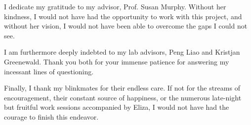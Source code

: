 
I dedicate my gratitude to my advisor, Prof. Susan Murphy.  Without her kindness, I would not have had the opportunity to work with this project, and without her vision, I would not have been able to overcome the gaps I could not see.

I am furthermore deeply indebted to my lab advisors, Peng Liao and Kristjan Greenewald.  Thank you both for your immense patience for answering my incessant lines of questioning.

Finally, I thank my blinkmates for their endless care.  If not for the streams of encouragement, their constant source of happiness, or the numerous late-night but fruitful work sessions accompanied by Eliza, I would not have had the courage to finish this endeavor.